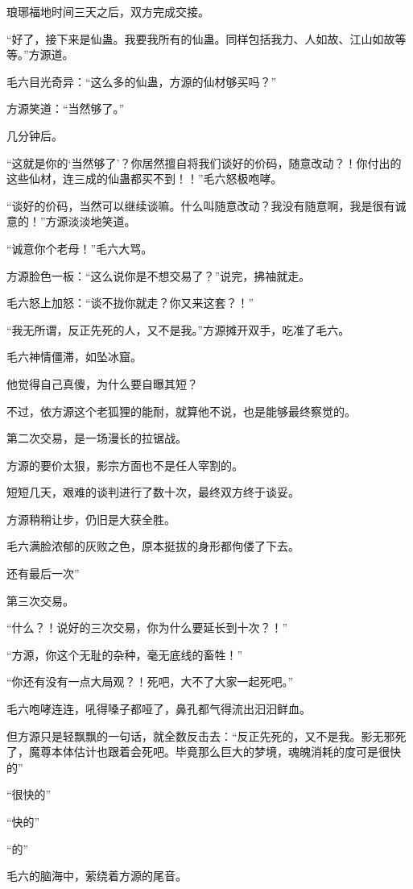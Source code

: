 \begin{this_body}
琅琊福地时间三天之后，双方完成交接。

“好了，接下来是仙蛊。我要我所有的仙蛊。同样包括我力、人如故、江山如故等等。”方源道。

毛六目光奇异：“这么多的仙蛊，方源的仙材够买吗？”

方源笑道：“当然够了。”

几分钟后。

“这就是你的‘当然够了’？你居然擅自将我们谈好的价码，随意改动？！你付出的这些仙材，连三成的仙蛊都买不到！！”毛六怒极咆哮。

“谈好的价码，当然可以继续谈嘛。什么叫随意改动？我没有随意啊，我是很有诚意的！”方源淡淡地笑道。

“诚意你个老母！”毛六大骂。

方源脸色一板：“这么说你是不想交易了？”说完，拂袖就走。

毛六怒上加怒：“谈不拢你就走？你又来这套？！”

“我无所谓，反正先死的人，又不是我。”方源摊开双手，吃准了毛六。

毛六神情僵滞，如坠冰窟。

他觉得自己真傻，为什么要自曝其短？

不过，依方源这个老狐狸的能耐，就算他不说，也是能够最终察觉的。

第二次交易，是一场漫长的拉锯战。

方源的要价太狠，影宗方面也不是任人宰割的。

短短几天，艰难的谈判进行了数十次，最终双方终于谈妥。

方源稍稍让步，仍旧是大获全胜。

毛六满脸浓郁的灰败之色，原本挺拔的身形都佝偻了下去。

还有最后一次”

第三次交易。

“什么？！说好的三次交易，你为什么要延长到十次？！”

“方源，你这个无耻的杂种，毫无底线的畜牲！”

“你还有没有一点大局观？！死吧，大不了大家一起死吧。”

毛六咆哮连连，吼得嗓子都哑了，鼻孔都气得流出汩汩鲜血。

但方源只是轻飘飘的一句话，就全数反击去：“反正先死的，又不是我。影无邪死了，魔尊本体估计也跟着会死吧。毕竟那么巨大的梦境，魂魄消耗的度可是很快的”

“很快的”

“快的”

“的”

毛六的脑海中，萦绕着方源的尾音。


\end{this_body}
